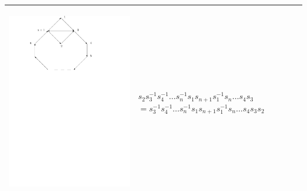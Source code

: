 \documentclass[11pt]{amsart}
\theoremstyle{definition}
\begin{document}
\begin{table}
\begin{tabular}{| p{3.5cm} | p{7cm} |}
\begin{center}\includegraphics[scale = .30]{Diagram2.pdf}\end{center} 
& $s_{2}s_{3}^{-1}s_{4}^{-1}\dots s_{n}^{-1}s_{1}s_{n+1}s_{1}^{-1}s_{n} \dots s_{4}s_{3}$
\newline $= s_{3}^{-1}s_{4}^{-1}\dots s_{n}^{-1}s_{1}s_{n+1}s_{1}^{-1}s_{n} \dots s_{4}s_{3}s_{2}$\\ \hline


\end{tabular}
\end{table}
\end{document}
